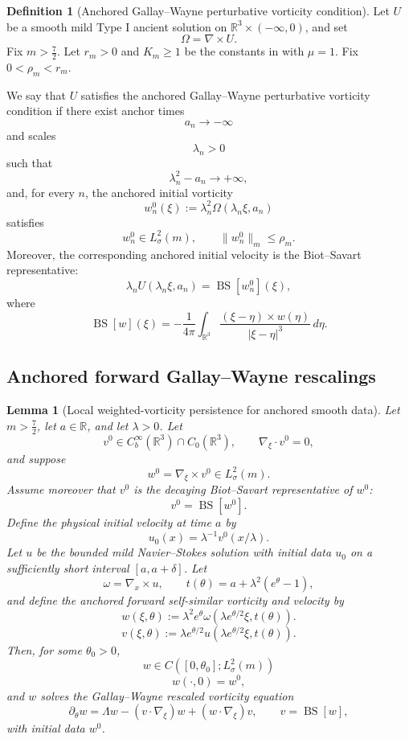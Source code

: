 \documentclass[11pt]{amsart}
\theoremstyle{plain}
\newtheorem{lemma}[lemma]{Lemma}
\theoremstyle{definition}
\newtheorem{definition}[definition]{Definition}
\theoremstyle{remark}
\numberwithin{equation}{section}
\begin{document}
\begin{definition}[Anchored Gallay--Wayne perturbative vorticity condition]
\label{p3:def:gw-anchored-condition}\label{p3:def:weighted-vorticity-condition}
Let \(U\) be a smooth mild Type I ancient solution on
\(\mathbb R^3\times(-\infty,0)\), and set
\[
   \Omega=\nabla\times U .
\]
Fix \(m>\frac72\).  Let \(r_m>0\) and \(K_m\ge1\) be the constants in
 with \(\mu=1\).  Fix \(0<\rho_m<r_m\).

We say that \(U\) satisfies the anchored Gallay--Wayne perturbative
vorticity condition if there exist anchor times
\[
   a_n\to-\infty
\]
and scales
\[
   \lambda_n>0
\]
such that
\[
   \lambda_n^2-a_n\to+\infty,
\]
and, for every \(n\), the anchored initial vorticity
\[
   w_n^0(\xi)
   :=
   \lambda_n^2\Omega(\lambda_n\xi,a_n)
\]
satisfies
\[
   w_n^0\in L^2_\sigma(m),
   \qquad
   \|w_n^0\|_m\le \rho_m.
\]
Moreover, the corresponding anchored initial velocity is the Biot--Savart
representative:
\[
   \lambda_n U(\lambda_n\xi,a_n)
   =
   \operatorname{BS}[w_n^0](\xi),
\]
where
\[
   \operatorname{BS}[w](\xi)
   =
   -\frac1{4\pi}
   \int_{\mathbb R^3}
   \frac{(\xi-\eta)\times w(\eta)}{|\xi-\eta|^3}\,d\eta .
\]
\end{definition}

\subsection{Anchored forward Gallay--Wayne rescalings}

\begin{lemma}[Local weighted-vorticity persistence for anchored smooth data]
\label{p3:lem:local-weighted-vorticity-persistence}
Let \(m>\frac72\), let \(a\in\mathbb R\), and let \(\lambda>0\).  Let
\[
   v^0\in C_b^\infty(\mathbb R^3)\cap C_0(\mathbb R^3),
   \qquad
   \nabla_\xi\cdot v^0=0,
\]
and suppose
\[
   w^0=\nabla_\xi\times v^0\in L^2_\sigma(m).
\]
Assume moreover that \(v^0\) is the decaying Biot--Savart representative of
\(w^0\):
\[
   v^0=\operatorname{BS}[w^0].
\]
Define the physical initial velocity at time \(a\) by
\[
   u_0(x)=\lambda^{-1}v^0(x/\lambda).
\]
Let \(u\) be the bounded mild Navier--Stokes solution with initial data
\(u_0\) on a sufficiently short interval \([a,a+\delta]\).  Let
\[
   \omega=\nabla_x\times u,
   \qquad
   t(\theta)=a+\lambda^2(e^\theta-1),
\]
and define the anchored forward self-similar vorticity and velocity by
\[
   w(\xi,\theta)
   :=
   \lambda^2 e^\theta
   \omega(\lambda e^{\theta/2}\xi,t(\theta)).
\]
\[
   v(\xi,\theta)
   :=
   \lambda e^{\theta/2}
   u(\lambda e^{\theta/2}\xi,t(\theta)).
\]
Then, for some \(\theta_0>0\),
\[
   w\in C([0,\theta_0];L^2_\sigma(m))
\]
\[
   w(\cdot,0)=w^0,
\]
and \(w\) solves the Gallay--Wayne rescaled vorticity equation
\[
   \partial_\theta w
   =
   \Lambda w-(v\cdot\nabla_\xi)w+(w\cdot\nabla_\xi)v,
   \qquad v=\operatorname{BS}[w],
\]
with initial data \(w^0\).
\end{lemma}
\end{document}
